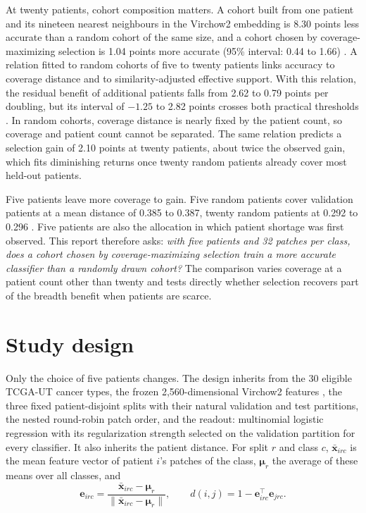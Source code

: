 \documentclass[11pt]{article}
\begin{document}
At twenty patients, cohort composition matters. A cohort built from one patient and its nineteen nearest neighbours in the Virchow2 embedding is 8.30 points less accurate than a random cohort of the same size, and a cohort chosen by coverage-maximizing selection is 1.04 points more accurate (95\% interval: 0.44 to 1.66) \citep{queisler2026cohortComposition}. A relation fitted to random cohorts of five to twenty patients links accuracy to coverage distance and to similarity-adjusted effective support. With this relation, the residual benefit of additional patients falls from 2.62 to 0.79 points per doubling, but its interval of $-1.25$ to 2.82 points crosses both practical thresholds \citep{queisler2026coverageRedundancy}. In random cohorts, coverage distance is nearly fixed by the patient count, so coverage and patient count cannot be separated. The same relation predicts a selection gain of 2.10 points at twenty patients, about twice the observed gain, which fits diminishing returns once twenty random patients already cover most held-out patients.

Five patients leave more coverage to gain. Five random patients cover validation patients at a mean distance of 0.385 to 0.387, twenty random patients at 0.292 to 0.296 \citep{queisler2026cohortComposition}. Five patients are also the allocation in which patient shortage was first observed. This report therefore asks: \emph{with five patients and 32 patches per class, does a cohort chosen by coverage-maximizing selection train a more accurate classifier than a randomly drawn cohort?} The comparison varies coverage at a patient count other than twenty and tests directly whether selection recovers part of the breadth benefit when patients are scarce.

\section{Study design}
\label{sec:design}
Only the choice of five patients changes. The design inherits from \citet{queisler2026cohortComposition} the 30 eligible TCGA-UT cancer types, the frozen 2,560-dimensional Virchow2 features \citep{zimmermann2024virchow2}, the three fixed patient-disjoint splits with their natural validation and test partitions, the nested round-robin patch order, and the readout: multinomial logistic regression with its regularization strength selected on the validation partition for every classifier. It also inherits the patient distance. For split $r$ and class $c$, $\bar{\mathbf x}_{irc}$ is the mean feature vector of patient $i$'s patches of the class, $\boldsymbol\mu_r$ the average of these means over all classes, and
\begin{equation}
 \mathbf e_{irc}=\frac{\bar{\mathbf x}_{irc}-\boldsymbol\mu_r}{\lVert\bar{\mathbf x}_{irc}-\boldsymbol\mu_r\rVert},
 \qquad
 d(i,j)=1-\mathbf e_{irc}^{\top}\mathbf e_{jrc}.
 \label{eq:distance}
\end{equation}
\end{document}
